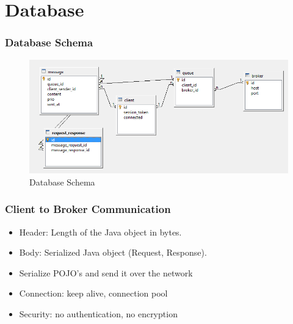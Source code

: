 \documentclass{beamer}
\begin{document}
\section{Database}
\begin{frame}
\frametitle{Database Schema}

\begin{figure}
  \begin{center}
    \includegraphics[scale=0.42]{../../database/db-schema.png}
  \end{center}
  \caption{Database Schema}
  \label{fig:db-schema}
\end{figure}
\end{frame}



\begin{frame}
\frametitle{Client to Broker Communication}

\begin{itemize}
\item Header: Length of the Java object in bytes.
\item Body: Serialized Java object (Request, Response).
\item Serialize POJO's and send it over the network
\item Connection: keep alive, connection pool
\item Security: no authentication, no encryption
\end{itemize}
\end{frame}
\end{document}
